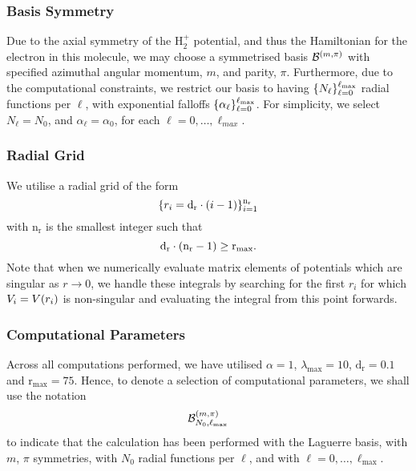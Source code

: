 \documentclass[draft]{article}
\begin{document}
\subsubsection*{Basis Symmetry}

Due to the axial symmetry of the $\mathrm{H}_{2}^{+}$ potential, and thus the
Hamiltonian for the electron in this molecule, we may choose a symmetrised
basis $\mathcal{B}^{(m, \pi)}$ with specified azimuthal angular momentum,
$m$, and parity, $\pi$.
Furthermore, due to the computational constraints, we restrict our basis to
having $\lbrace N_{\ell}\rbrace_{\ell = 0}^{\ell_{\max}}$ radial functions per $\ell$,
with exponential falloffs $\lbrace\alpha_{\ell}\rbrace_{\ell = 0}^{\ell_{\max}}$.
For simplicity, we select $N_{\ell} = N_{0}$, and $\alpha_{\ell} = \alpha_{0}$,
for each $\ell = 0, \dotsc, \ell_{max}$.

\subsubsection*{Radial Grid}

We utilise a radial grid of the form
\begin{equation}
  \label{eq:radial-grid}
  \lbrace
    r_{i}
    =
    \mathrm{d_{r}}
    \cdot
    (i - 1)
  \rbrace_{i = 1}^{\mathrm{n_{r}}}
\end{equation}
with $\mathrm{n_{r}}$ is the smallest integer such that
\begin{equation}
  \label{eq:radial-grid-n}
  \mathrm{d_{r}}
  \cdot
  (\mathrm{n_{r}} - 1)
  \geq
  \mathrm{r}_{\max}
  .
\end{equation}
Note that when we numerically evaluate matrix elements of potentials which are
singular as $r \to 0$, we handle these integrals by searching for the first
$r_{i}$ for which $V_{i} = V(r_{i})$ is non-singular and evaluating the
integral from this point forwards.

\subsubsection*{Computational Parameters}

Across all computations performed, we have utilised $\alpha = 1$,
$\lambda_{\max} = 10$, $\mathrm{d_{r}} = 0.1$ and $\mathrm{r}_{\max} = 75$.
Hence, to denote a selection of computational parameters, we shall use the
notation
\begin{equation}
  \label{eq:basis-parameter}
  \mathcal{B}_{N_{0}, \ell_{\max}}^{(m, \pi)}
\end{equation}
to indicate that the calculation has been performed with the Laguerre basis,
with $m$, $\pi$ symmetries, with $N_{0}$ radial functions per $\ell$, and with
$\ell = 0, \dotsc, \ell_{\max}$.
\end{document}
